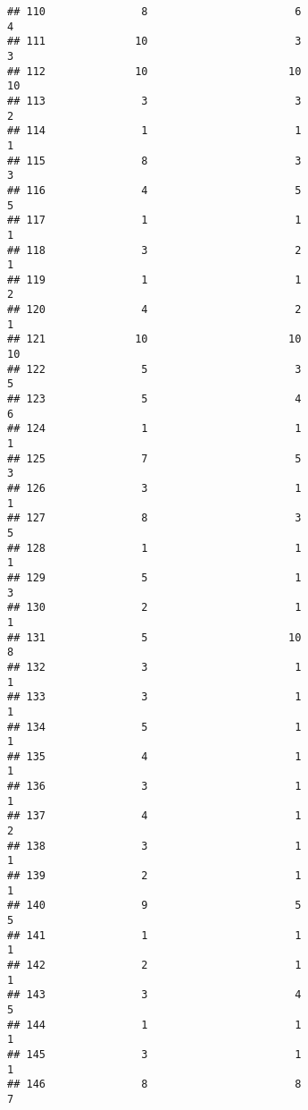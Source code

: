 \documentclass[
]{article}
\begin{document}
\begin{verbatim}
## 110               8                       6                        4
## 111              10                       3                        3
## 112              10                      10                       10
## 113               3                       3                        2
## 114               1                       1                        1
## 115               8                       3                        3
## 116               4                       5                        5
## 117               1                       1                        1
## 118               3                       2                        1
## 119               1                       1                        2
## 120               4                       2                        1
## 121              10                      10                       10
## 122               5                       3                        5
## 123               5                       4                        6
## 124               1                       1                        1
## 125               7                       5                        3
## 126               3                       1                        1
## 127               8                       3                        5
## 128               1                       1                        1
## 129               5                       1                        3
## 130               2                       1                        1
## 131               5                      10                        8
## 132               3                       1                        1
## 133               3                       1                        1
## 134               5                       1                        1
## 135               4                       1                        1
## 136               3                       1                        1
## 137               4                       1                        2
## 138               3                       1                        1
## 139               2                       1                        1
## 140               9                       5                        5
## 141               1                       1                        1
## 142               2                       1                        1
## 143               3                       4                        5
## 144               1                       1                        1
## 145               3                       1                        1
## 146               8                       8                        7

\end{verbatim}
\end{document}
